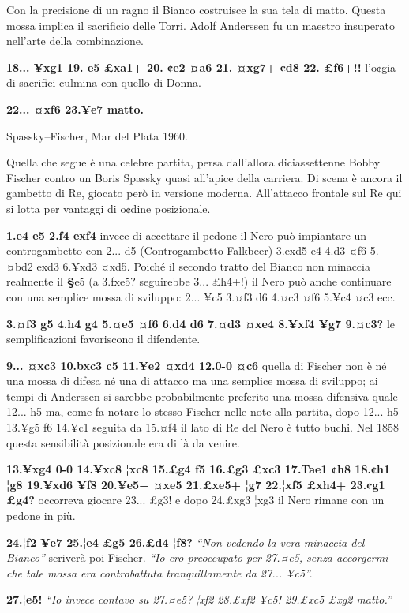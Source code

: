 \documentclass[
]{article}
\begin{document}
Con la precisione di un ragno il Bianco costruisce la sua tela di matto.
Questa mossa implica il sacrificio delle Torri. Adolf Anderssen fu un
maestro insuperato nell'arte della combinazione.

\textbf{18... ¥xg1 19. e5 £xa1+ 20. ¢e2 ¤a6 21. ¤xg7+ ¢d8 22. £f6+!!}
l'o¢gia di sacrifici culmina con quello di Donna.

\textbf{22... ¤xf6 23.¥e7 matto.}

Spassky--Fischer, Mar del Plata 1960.

Quella che segue è una celebre partita, persa dall'allora diciassettenne
Bobby Fischer contro un Boris Spassky quasi all'apice della carriera. Di
scena è ancora il gambetto di Re, giocato però in versione moderna.
All'attacco frontale sul Re qui si lotta per vantaggi di o¢dine
posizionale.

\textbf{1.e4 e5 2.f4 exf4} invece di accettare il pedone il Nero può
impiantare un controgambetto con 2... d5 (Controgambetto Falkbeer)
3.exd5 e4 4.d3 ¤f6 5.¤bd2 exd3 6.¥xd3 ¤xd5. Poiché il secondo tratto del
Bianco non minaccia realmente il \textbf{§}e5 (a 3.fxe5? seguirebbe 3...
£h4+!) il Nero può anche continuare con una semplice mossa di sviluppo:
2... ¥c5 3.¤f3 d6 4.¤c3 ¤f6 5.¥c4 ¤c3 ecc.

\textbf{3.¤f3 g5 4.h4 g4 5.¤e5 ¤f6 6.d4 d6 7.¤d3 ¤xe4 8.¥xf4 ¥g7 9.¤c3?}
le semplificazioni favoriscono il difendente.

\textbf{9... ¤xc3 10.bxc3 c5 11.¥e2 ¤xd4 12.0-0 ¤c6} quella di Fischer
non è né una mossa di difesa né una di attacco ma una semplice mossa di
sviluppo; ai tempi di Anderssen si sarebbe probabilmente preferito una
mossa difensiva quale 12... h5 ma, come fa notare lo stesso Fischer
nelle note alla partita, dopo 12... h5 13.¥g5 f6 14.¥c1 seguita da
15.¤f4 il lato di Re del Nero è tutto buchi. Nel 1858 questa sensibilità
posizionale era di là da venire.

\textbf{13.¥xg4 0-0 14.¥xc8 ¦xc8 15.£g4 f5 16.£g3 £xc3 17.Tae1 ¢h8
18.¢h1 ¦g8 19.¥xd6 ¥f8 20.¥e5+ ¤xe5 21.£xe5+ ¦g7 22.¦xf5 £xh4+ 23.¢g1
£g4?} occorreva giocare 23... £g3! e dopo 24.£xg3 ¦xg3 il Nero rimane
con un pedone in più.

\textbf{24.¦f2 ¥e7 25.¦e4 £g5 26.£d4 ¦f8?} \emph{``Non vedendo la vera
minaccia del Bianco''} scriverà poi Fischer. \emph{``Io ero preoccupato
per 27.¤e5, senza accorgermi che tale mossa era controbattuta
tranquillamente da 27... ¥c5''.}

\textbf{27.¦e5!} \emph{``Io invece contavo su 27.¤e5? ¦xf2 28.£xf2 ¥c5!
29.£xc5 £xg2 matto.''}
\end{document}
